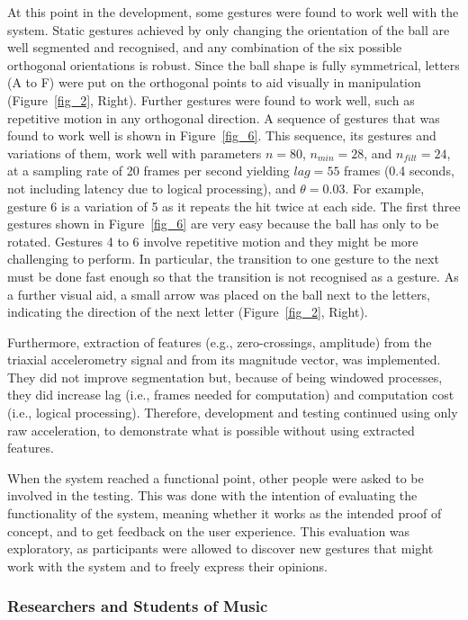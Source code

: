 \documentclass{nime-alternate_MANUSCRIPT} %
\begin{document}
At this point in the development, some gestures were found to work well with the system. Static gestures achieved by only changing the orientation of the ball are well segmented and recognised, and any combination of the six possible orthogonal orientations is robust. Since the ball shape is fully symmetrical, letters (A to F) were put on the orthogonal points to aid visually in manipulation (Figure~\ref{fig_2}, Right). Further gestures were found to work well, such as repetitive motion in any orthogonal direction. A sequence of gestures that was found to work well is shown in Figure~\ref{fig_6}. This sequence, its gestures and variations of them, work well with  parameters $n = 80$, $n_{min} = 28$, and $n_{filt} = 24$, at a sampling rate of 20 frames per second yielding $lag = 55$ frames (0.4 seconds, not including latency due to logical processing), and $\theta = 0.03$. For example, gesture 6 is a variation of 5 as it repeats the hit twice at each side. The first three gestures shown in Figure~\ref{fig_6} are very easy because the ball has only to be rotated. Gestures 4 to 6 involve repetitive motion and they might be more challenging to perform. In particular, the transition to one gesture to the next must be done fast enough so that the transition is not recognised as a gesture. As a further visual aid, a small arrow was placed on the ball next to the letters, indicating the direction of the next letter (Figure~\ref{fig_2}, Right).

Furthermore, extraction of features (e.g., zero-crossings, amplitude) from the triaxial accelerometry signal and from its magnitude vector, was implemented. They did not improve segmentation but,  because of being windowed processes, they did increase lag (i.e., frames needed for computation) and computation cost (i.e., logical processing). Therefore, development and testing continued using only raw acceleration, to demonstrate what is possible without using extracted features. 
	
When the system reached a functional point, other people were asked to be involved in the testing. This was done with the intention of evaluating the functionality of the system, meaning whether it works as the intended proof of concept, and to get feedback on the user experience. This evaluation was exploratory, as participants were allowed to discover new gestures that might work with the system and to freely express their opinions.

\subsubsection{Researchers and Students of Music}
\end{document}
